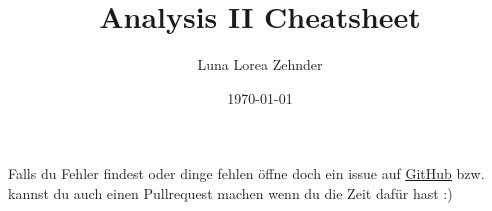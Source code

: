 \documentclass[8pt]{article}
\title{Analysis II Cheatsheet}
\author{Luna Lorea Zehnder}
\date{\today}
\begin{document}
\begin{multicols*}{4}
  \maketitle %
  Falls du Fehler findest oder dinge fehlen öffne doch ein issue auf \color{Maroon4}\href{https://github.com/LunaLorea/Analysis-II-Cheatsheet}{\underline{GitHub}}\color{defaultcolor}  \;bzw. kannst du auch einen Pullrequest machen wenn du die Zeit dafür hast :)
  
  
\end{multicols*}
\end{document}
